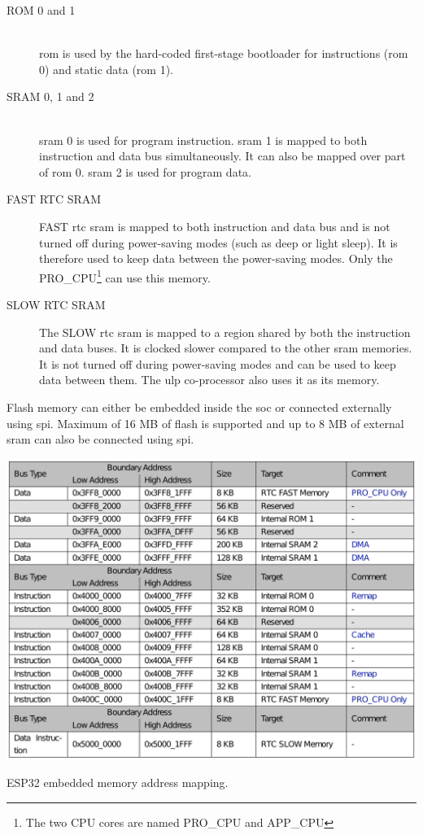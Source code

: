 \begin{description}
    \item[ROM 0 and 1] \hfill \\
        \Gls{rom} is used by the hard-coded first-stage bootloader for instructions (\gls{rom} 0) and static data (\gls{rom} 1).
    \item[SRAM 0, 1 and 2] \hfill \\
        \Gls{sram} 0 is used for program instruction. \Gls{sram} 1 is mapped to both instruction and data bus simultaneously. It can also be mapped over part of \gls{rom} 0. \Gls{sram} 2 is used for program data.
    \item[FAST RTC SRAM] FAST \gls{rtc} \gls{sram} is mapped to both instruction and data bus and is not turned off during power-saving modes (such as deep or light sleep). It is therefore used to keep data between the power-saving modes. Only the PRO\_CPU\footnote{The two CPU cores are named PRO\_CPU and APP\_CPU} can use this memory.
    \item[SLOW RTC SRAM] The SLOW \gls{rtc} \gls{sram} is mapped to a region shared by both the instruction and data buses. It is clocked slower compared to the other \gls{sram} memories. It is not turned off during power-saving modes and can be used to keep data between them. The \gls{ulp} co-processor also uses it as its memory.
\end{description}

Flash memory can either be embedded inside the \gls{soc} or connected externally using \gls{spi}. Maximum of 16 MB of flash is supported and up to 8 MB of external \gls{sram} can also be connected using \gls{spi}.

\begin{table}[ht!]
    \centering
    \captionsetup{justification=centering,margin=0.5cm}
    \includegraphics[width=\textwidth]{images/memory_mapping.pdf}
    \caption[ESP32 embedded memory address mapping.]{ESP32 embedded memory address mapping.\cite{esp322021}}
    \label{table:memory_mapping}
\end{table}

